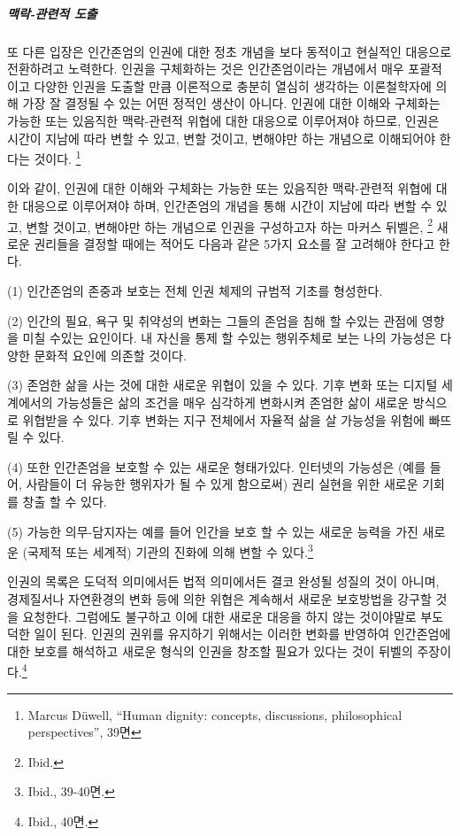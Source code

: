 \subparagraph{맥락-관련적 도출}

또 다른 입장은 인간존엄의 인권에 대한 정초 개념을 보다 동적이고 현실적인 대응으로 전환하려고 노력한다. 인권을 구체화하는 것은 인간존엄이라는 개념에서 매우 포괄적이고 다양한 인권을 도출할 만큼 이론적으로 충분히 열심히 생각하는 이론철학자에 의해 가장 잘 결정될 수 있는 어떤 정적인 생산이 아니다. 인권에 대한 이해와 구체화는 가능한 또는 있음직한 맥락-관련적 위협에 대한 대응으로 이루어져야 하므로, 인권은 시간이 지남에 따라 변할 수 있고, 변할 것이고, 변해야만 하는 개념으로 이해되어야 한다는 것이다. \footnote{Marcus Düwell, ``Human dignity: concepts, discussions, philosophical perspectives'', 39면}

이와 같이, 인권에 대한 이해와 구체화는 가능한 또는 있음직한 맥락-관련적 위협에 대한 대응으로 이루어져야 하며, 인간존엄의 개념을 통해 시간이 지남에 따라 변할 수 있고, 변할 것이고, 변해야만 하는 개념으로 인권을 구성하고자 하는 마커스 뒤벨은, \footnote{Ibid.} 새로운 권리들을 결정할 때에는 적어도 다음과 같은 5가지 요소를 잘 고려해야 한다고 한다.

\begin{displayquote}
(1) 인간존엄의 존중과 보호는 전체 인권 체제의 규범적 기초를 형성한다.

(2) 인간의 필요, 욕구 및 취약성의 변화는 그들의 존엄을 침해 할 수있는 관점에 영향을 미칠 수있는 요인이다. 내 자신을 통제 할 수있는 행위주체로 보는 나의 가능성은 다양한 문화적 요인에 의존할 것이다.

(3) 존엄한 삶을 사는 것에 대한 새로운 위협이 있을 수 있다. 기후 변화 또는 디지털 세계에서의 가능성들은 삶의 조건을 매우 심각하게 변화시켜 존엄한 삶이 새로운 방식으로 위협받을 수 있다. 기후 변화는 지구 전체에서 자율적 삶을 살 가능성을 위험에 빠뜨릴 수 있다.

(4) 또한 인간존엄을 보호할 수 있는 새로운 형태가있다. 인터넷의 가능성은 (예를 들어, 사람들이 더 유능한 행위자가 될 수 있게 함으로써) 권리 실현을 위한 새로운 기회를 창출 할 수 있다.

(5) 가능한 의무-담지자는 예를 들어 인간을 보호 할 수 있는 새로운 능력을 가진 새로운 (국제적 또는 세계적) 기관의 진화에 의해 변할 수 있다.\footnote{Ibid., 39-40면.}
\end{displayquote}

인권의 목록은 도덕적 의미에서든 법적 의미에서든 결코 완성될 성질의 것이 아니며, 경제질서나 자연환경의 변화 등에 의한 위협은 계속해서 새로운 보호방법을 강구할 것을 요청한다. 그럼에도 불구하고 이에 대한 새로운 대응을 하지 않는 것이야말로 부도덕한 일이 된다. 인권의 권위를 유지하기 위해서는 이러한 변화를 반영하여 인간존엄에 대한 보호를 해석하고 새로운 형식의 인권을 창조할 필요가 있다는 것이 뒤벨의 주장이다.\footnote{Ibid., 40면.}

